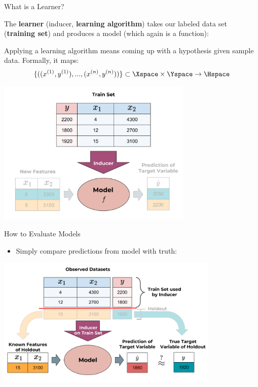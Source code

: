 \begin{frame}{What is a Learner?}

The \textbf{learner} (inducer, \textbf{learning algorithm}) takes our labeled data set
(\textbf{training set}) and produces a model (which again is a
function):

Applying a learning algorithm means coming up with a hypothesis given sample data. 
Formally, it maps:
$$\{((x^{(1)},y^{(1)}),...,(x^{(n)},y^{(n)}))\} \subset \Xspace \times \Yspace \rightarrow \Hspace$$

\vspace{-0.5cm}

\scriptsize

\begin{center}\includegraphics[width=0.7\textwidth]{plots/the_inducer_web} \end{center}

\normalsize 

\end{frame}

\begin{frame}{How to Evaluate Models}

\begin{itemize}

\item
  Simply compare predictions from model with truth:
\end{itemize}

\scriptsize

\begin{center}\includegraphics[width=0.8\textwidth]{plots/eval_inducer1_web} \end{center}

\normalsize 
\end{frame}


